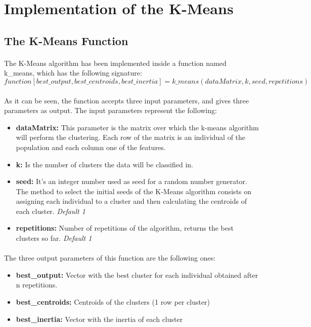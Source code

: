 \documentclass[12pt, a4paper]{article}
\begin{document}
\section{Implementation of the K-Means} %
\label{sec:implementation_of_the_k_means}

\subsection{The K-Means Function} %
\label{sub:the_k_means_function}
\paragraph{}The K-Means algorithm has been implemented inside a function named k\_means, which has the following signature:
\[
function [ best\_output, best\_centroids, best\_inertia ] = k\_means( dataMatrix, k, seed, repetitions )
\]
\paragraph{}As it can be seen, the function accepts three input parameters, and gives three parameters as output. The input parameters represent the following:
\begin{itemize}
	\item \textbf{dataMatrix:} This parameter is the matrix over which the k-means algorithm will perform the clustering. Each row of the matrix is an individual of the population and each column one of the features.
	\item \textbf{k:} Is the number of clusters the data will be classified in.
	\item \textbf{seed:} It's an integer number used as seed for a random number generator. The method to select the initial seeds of the K-Means algorithm consists on assigning each individual to a cluster and then calculating the centroids of each cluster. \emph{Default 1}
	\item \textbf{repetitions:} Number of repetitions of the algorithm, returns the best clusters so far. \emph{Default 1}
\end{itemize}
\paragraph{}The three output parameters of this function are the following ones:
\begin{itemize}
	\item \textbf{best\_output:} Vector with the best cluster for each individual obtained after n repetitions.
	\item \textbf{best\_centroids:} Centroids of the clusters (1 row per cluster)
	\item \textbf{best\_inertia:} Vector with the inertia of each cluster
\end{itemize}
\end{document}
